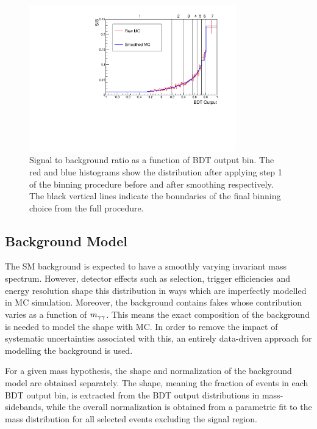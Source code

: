 \begin{figure}
 \begin{center}
  \includegraphics[width=0.8\textwidth]{hgg7TeV/sidebandMvaPlots/binningscheme.pdf}
 \end{center}
 \caption{Signal to background ratio as a function of BDT output bin.
 The red and blue histograms show the distribution after applying step 1 of the binning procedure before
and after smoothing respectively. The black vertical lines indicate the boundaries of the final
binning choice from the full procedure.}
 \label{fig:binningscheme}
\end{figure}


\subsection{Background Model}
\label{sec:backgroundmodel}

The SM background is expected to have a smoothly varying invariant mass spectrum.
However, detector effects such as selection, trigger efficiencies and energy resolution 
shape this distribution in ways which are imperfectly modelled in MC simulation.
Moreover, the background contains fakes whose contribution varies as a function of $m_{\gamma\gamma}$.
This means the exact composition of the background is needed to model the shape with MC.
In order to remove the impact of systematic uncertainties associated with this, an entirely data-driven
approach for modelling the background is used.

For a given mass hypothesis, the shape and normalization of the background model are obtained separately. 
The shape, meaning the fraction of events in each BDT output bin, is extracted
from the BDT output distributions in mass-sidebands, while the overall normalization is obtained
from a parametric fit to the mass distribution for all selected events excluding the signal region.

